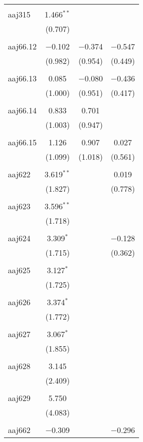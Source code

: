 \begin{table}[!htbp]
\begin{tabular}{@{\extracolsep{5pt}}lccc}
  & & & \\ 
 aaj315 & 1.466$^{**}$ &  &  \\ 
  & (0.707) &  &  \\ 
  & & & \\ 
 aaj66.12 & $-$0.102 & $-$0.374 & $-$0.547 \\ 
  & (0.982) & (0.954) & (0.449) \\ 
  & & & \\ 
 aaj66.13 & 0.085 & $-$0.080 & $-$0.436 \\ 
  & (1.000) & (0.951) & (0.417) \\ 
  & & & \\ 
 aaj66.14 & 0.833 & 0.701 &  \\ 
  & (1.003) & (0.947) &  \\ 
  & & & \\ 
 aaj66.15 & 1.126 & 0.907 & 0.027 \\ 
  & (1.099) & (1.018) & (0.561) \\ 
  & & & \\ 
 aaj622 & 3.619$^{**}$ &  & 0.019 \\ 
  & (1.827) &  & (0.778) \\ 
  & & & \\ 
 aaj623 & 3.596$^{**}$ &  &  \\ 
  & (1.718) &  &  \\ 
  & & & \\ 
 aaj624 & 3.309$^{*}$ &  & $-$0.128 \\ 
  & (1.715) &  & (0.362) \\ 
  & & & \\ 
 aaj625 & 3.127$^{*}$ &  &  \\ 
  & (1.725) &  &  \\ 
  & & & \\ 
 aaj626 & 3.374$^{*}$ &  &  \\ 
  & (1.772) &  &  \\ 
  & & & \\ 
 aaj627 & 3.067$^{*}$ &  &  \\ 
  & (1.855) &  &  \\ 
  & & & \\ 
 aaj628 & 3.145 &  &  \\ 
  & (2.409) &  &  \\ 
  & & & \\ 
 aaj629 & 5.750 &  &  \\ 
  & (4.083) &  &  \\ 
  & & & \\ 
 aaj662 & $-$0.309 &  & $-$0.296 \\ 

\end{tabular}
\end{table}
